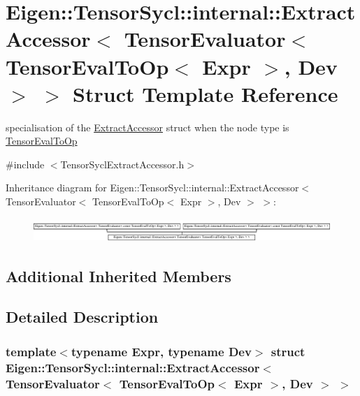 \hypertarget{struct_eigen_1_1_tensor_sycl_1_1internal_1_1_extract_accessor_3_01_tensor_evaluator_3_01_tensor_cfda1f933d4b02ee54719f6502db4b15}{}\section{Eigen\+:\+:Tensor\+Sycl\+:\+:internal\+:\+:Extract\+Accessor$<$ Tensor\+Evaluator$<$ Tensor\+Eval\+To\+Op$<$ Expr $>$, Dev $>$ $>$ Struct Template Reference}
\label{struct_eigen_1_1_tensor_sycl_1_1internal_1_1_extract_accessor_3_01_tensor_evaluator_3_01_tensor_cfda1f933d4b02ee54719f6502db4b15}


specialisation of the \hyperlink{struct_eigen_1_1_tensor_sycl_1_1internal_1_1_extract_accessor}{Extract\+Accessor} struct when the node type is \hyperlink{class_eigen_1_1_tensor_eval_to_op}{Tensor\+Eval\+To\+Op}  




{\ttfamily \#include $<$Tensor\+Sycl\+Extract\+Accessor.\+h$>$}

Inheritance diagram for Eigen\+:\+:Tensor\+Sycl\+:\+:internal\+:\+:Extract\+Accessor$<$ Tensor\+Evaluator$<$ Tensor\+Eval\+To\+Op$<$ Expr $>$, Dev $>$ $>$\+:\begin{figure}[H]
\begin{center}
\leavevmode
\includegraphics[height=0.900322cm]{struct_eigen_1_1_tensor_sycl_1_1internal_1_1_extract_accessor_3_01_tensor_evaluator_3_01_tensor_cfda1f933d4b02ee54719f6502db4b15}
\end{center}
\end{figure}
\subsection*{Additional Inherited Members}


\subsection{Detailed Description}
\subsubsection*{template$<$typename Expr, typename Dev$>$\newline
struct Eigen\+::\+Tensor\+Sycl\+::internal\+::\+Extract\+Accessor$<$ Tensor\+Evaluator$<$ Tensor\+Eval\+To\+Op$<$ Expr $>$, Dev $>$ $>$}

